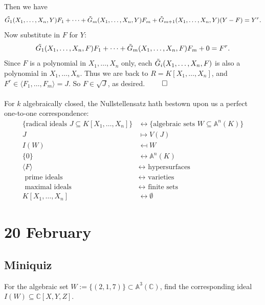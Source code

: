 \documentclass[12pt]{article}
\newcommand{\cx}{\mathbb{C}}
\newcommand{\vbrack}[1]{\langle #1\rangle}
\theoremstyle{definition}
\begin{document}
Then we have
\[\Tilde{G_1}(X_1,\dotsc,X_n,Y)F_1+\dotsb+\Tilde{G}_m(X_1,\dotsc,X_n,Y)F_m+\Tilde{G}_{m+1}(X_1,\dotsc,X_n,Y)(Y-F)=Y^r.\]
Now substitute in $F$ for $Y$:
\[\Tilde{G_1}(X_1,\dotsc,X_n,F)F_1+\dotsb+\Tilde{G}_m(X_1,\dotsc,X_n,F)F_m+0=F^r.\]
Since $F$ is a polynomial in $X_1,\dotsc,X_n$ only, each $\Tilde{G}_i(X_1,\dotsc,X_n,F)$ is also a polynomial in $X_1,\dotsc,X_n$. Thus we are back to $R=K[X_1,\dotsc,X_n]$, and $F^r\in\vbrack{F_1,\dotsc,F_m}=J$. So $F\in\sqrt{J}$, as desired. $\qed$\\\\
For $k$ algebraically closed, the Nullstellensatz hath bestown upon us a perfect one-to-one correspondence:
\begin{equation}
    \begin{split}
        \{\text{radical ideals }J\subseteq K[X_1,\dotsc,X_n]\}&\longleftrightarrow\{\text{algebraic sets }W\subseteq\mathbb{A}^n(K)\}\\
        J&\mapsto V(J)\\
        I(W)&\mapsfrom  W\\
        \{0\}&\longleftrightarrow\mathbb{A}^n(K)\\
        \vbrack{F}&\longleftrightarrow\text{ hypersurfaces }\\
        \text{ prime ideals }&\longleftrightarrow\text{ varieties }\\
        \text{ maximal ideals }&\longleftrightarrow\text{ finite sets }\\
        K[X_1,\dotsc,X_n]&\longleftrightarrow\emptyset
    \end{split}
\end{equation}
\section{20 February}
\subsection{Miniquiz}
For the algebraic set $W:=\{(2,1,7)\}\subset\mathbb{A}^3(\cx)$, find the corresponding ideal $I(W)\subseteq\cx[X,Y,Z]$.
\end{document}
